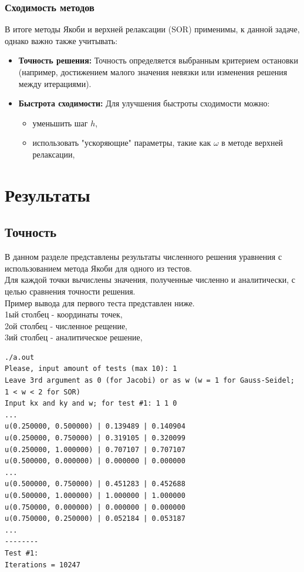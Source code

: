\documentclass[a4paper, fleqn]{report}
\begin{document}
\subsection*{Сходимость методов}
В итоге методы Якоби и верхней релаксации (SOR) применимы, к данной задаче, однако важно также учитывать:
\begin{itemize}
    \item \textbf{Точность решения:} Точность определяется выбранным критерием остановки (например, достижением малого значения невязки или изменения решения между итерациями).
    \item \textbf{Быстрота сходимости:} Для улучшения быстроты сходимости можно:
    \begin{itemize}
        \item уменьшить шаг $h$,
        \item использовать "ускоряющие" параметры, такие как $\omega$ в методе верхней релаксации,
    \end{itemize}
\end{itemize}
\newpage


\chapter{Результаты}

\section*{Точность}
В данном разделе представлены результаты численного решения уравнения с использованием метода Якоби для одного из тестов. \\
Для каждой точки вычислены значения, полученные численно и аналитически, с целью сравнения точности решения. \\
Пример вывода для первого теста представлен ниже. \\
1ый столбец - координаты точек, \\
2ой столбец - численное рещение, \\
3ий столбец - аналитическое решение, \\

\lstset{language=bash}
\begin{lstlisting}[title={Вывод метода Якоби дл 1го теста (для некоторых точек, покоординатно кратных 0.25)}]
./a.out
Please, input amount of tests (max 10): 1
Leave 3rd argument as 0 (for Jacobi) or as w (w = 1 for Gauss-Seidel; 1 < w < 2 for SOR)
Input kx and ky and w; for test #1: 1 1 0
...
u(0.250000, 0.500000) | 0.139489 | 0.140904
u(0.250000, 0.750000) | 0.319105 | 0.320099
u(0.250000, 1.000000) | 0.707107 | 0.707107
u(0.500000, 0.000000) | 0.000000 | 0.000000
...
u(0.500000, 0.750000) | 0.451283 | 0.452688
u(0.500000, 1.000000) | 1.000000 | 1.000000
u(0.750000, 0.000000) | 0.000000 | 0.000000
u(0.750000, 0.250000) | 0.052184 | 0.053187
...
--------
Test #1:
Iterations = 10247
\end{lstlisting} 
\vspace{0.25cm}
\end{document}
